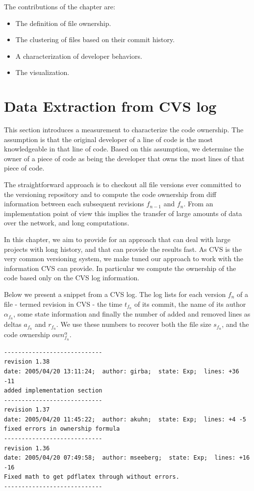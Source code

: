 The contributions of the chapter are:
\begin{itemize}
\item The definition of file ownership.
\item The clustering of files based on their commit history.
\item A characterization of developer behaviors.
\item The \omap visualization.
\end{itemize}

\section{Data Extraction from CVS log}\label{sec:ownership}

This section introduces a measurement to characterize the code ownership. The assumption is that the original developer of a line of code is the most knowledgeable in that line of code. Based on this assumption, we determine the owner of a piece of code as being the developer that owns the most lines  of that piece of code.

The straightforward approach is to checkout all file versions ever committed to the versioning repository and to compute the code ownership from diff information between each subsequent revisions $f_{n-1}$ and $f_n$. From an implementation point of view this implies the transfer of large amounts of data over the network, and long computations.

In this chapter, we aim to provide for an approach that can deal with large projects with long history, and that can provide the results fast. As CVS is the very common versioning system, we make tuned our approach to work with the information CVS can provide. In particular we compute the ownership of the code based only on the CVS log information.

Below we present a snippet from a CVS log. The log lists for each version $f_n$ of a file \-- termed revision in CVS \-- the time $t_{f_n}$ of its commit, the name of its author $\alpha_{f_n}$, some state information and finally the number of added and removed lines as deltas $a_{f_n}$ and $r_{f_n}$. We use these numbers to recover both the file size $s_{f_n}$, and the code ownership $own_{f_n}^\alpha$.

\begin{tiny}\begin{verbatim}
----------------------------
revision 1.38
date: 2005/04/20 13:11:24;  author: girba;  state: Exp;  lines: +36 -11
added implementation section
----------------------------
revision 1.37
date: 2005/04/20 11:45:22;  author: akuhn;  state: Exp;  lines: +4 -5
fixed errors in ownership formula
----------------------------
revision 1.36
date: 2005/04/20 07:49:58;  author: mseeberg;  state: Exp;  lines: +16 -16
Fixed math to get pdflatex through without errors.
----------------------------
\end{verbatim}\end{tiny}

